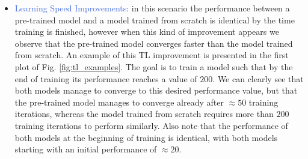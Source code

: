 \begin{itemize}
	\item \textcolor{RoyalBlue}{Learning Speed Improvements}: in this scenario the performance between a pre-trained model and a model trained from scratch is identical by the time training is finished, however when this kind of improvement appears we observe that the pre-trained model converges faster than the model trained from scratch. An example of this TL improvement is presented in the first plot of Fig. \ref{fig:tl_examples}. The goal is to train a model such that by the end of training its performance reaches a value of $200$. We can clearly see that both models manage to converge to this desired performance value, but that the pre-trained model manages to converge already after $\approx 50$ training iterations, whereas the model trained from scratch requires more than $200$ training iterations to perform similarly. Also note that the performance of both models at the beginning of training is identical, with both models starting with an initial performance of $\approx20$.


\end{itemize}
